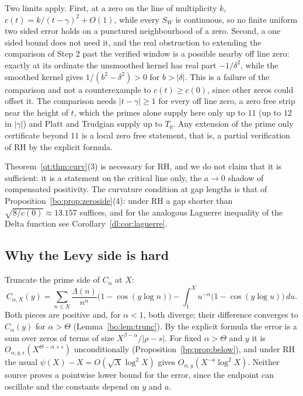 \begin{remark}\label{qt:rem:curvobs}
Two limits apply. First, at a zero on the line of multiplicity $k$, $c(t)=k/(t-\gamma)^2+O(1)$, while every $S_W$ is continuous, so no finite uniform two sided error holds on a punctured neighbourhood of a zero. Second, a one sided bound does not need it, and the real obstruction to extending the comparison of Step 2 past the verified window is a possible nearby off line zero: exactly at its ordinate the unsmoothed kernel has real part $-1/\delta^2$, while the smoothed kernel gives $1/(b^2-\delta^2)>0$ for $b>|\delta|$. This is a failure of the comparison and not a counterexample to $c(t)\ge c(0)$, since other zeros could offset it. The comparison needs $|t-\gamma|\ge1$ for every off line zero, a zero free strip near the height of $t$, which the primes alone supply here only up to $11$ (up to $12$ in $|\gamma|$) and Platt and Trudgian supply up to $T_0$. Any extension of the prime only certificate beyond $11$ is a local zero free statement, that is, a partial verification of RH by the explicit formula.
\end{remark}

\begin{remark}
Theorem~\ref{qt:thm:curv}(3) is necessary for RH, and we do not claim that it is sufficient: it is a statement on the critical line only, the $a\to0$ shadow of compensated positivity. The curvature condition at gap lengths is that of Proposition~\ref{bo:prop:zeroside}(4): under RH a gap shorter than $\sqrt{8/c(0)}\approx13.157$ suffices, and for the analogous Laguerre inequality of the Delta function see Corollary~\ref{dl:cor:laguerre}.
\end{remark}

\subsection{Why the Levy side is hard}

Truncate the prime side of $C_\alpha$ at $X$:
\[
C_{\alpha,X}(y)=\sum_{n\le X}\frac{\Lambda(n)}{n^\alpha}\big(1-\cos(y\log n)\big)-\int_1^Xu^{-\alpha}\big(1-\cos(y\log u)\big)\,du .
\]
Both pieces are positive and, for $\alpha<1$, both diverge; their difference converges to $C_\alpha(y)$ for $\alpha>\Theta$ (Lemma~\ref{bo:lem:trunc}). By the explicit formula the error is a sum over zeros of terms of size $X^{\beta-\alpha}/|\rho-s|$. For fixed $\alpha>\Theta$ and $y$ it is $O_{\alpha,y,\epsilon}(X^{\Theta-\alpha+\epsilon})$ unconditionally (Proposition~\ref{bp:prop:below}), and under RH the usual $\psi(X)-X=O(\sqrt X\log^2X)$ gives $O_{\alpha,y}(X^{-a}\log^2X)$. Neither source proves a pointwise lower bound for the error, since the endpoint can oscillate and the constants depend on $y$ and $a$.

